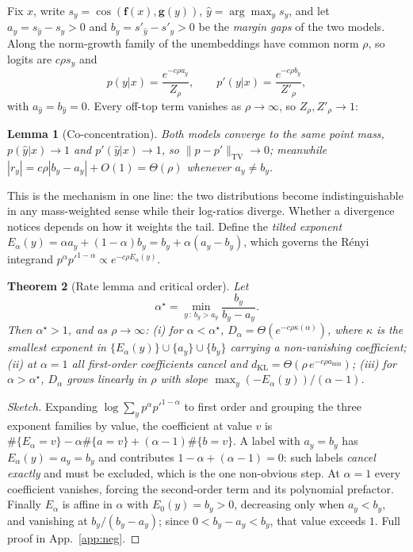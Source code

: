 \documentclass[10pt,letterpaper,twocolumn]{article}
\newcommand{\bff}{\mathbf{f}}
\newcommand{\bfg}{\mathbf{g}}
\newcommand{\dKL}{d_{\mathrm{KL}}}
\newcommand{\Dalpha}{D_{\alpha}}
\newcommand{\TV}{\mathrm{TV}}
\theoremstyle{plain}
\newtheorem{theorem}{Theorem}
\newtheorem{lemma}[theorem]{Lemma}
\theoremstyle{definition}
\theoremstyle{remark}
\begin{document}
Fix $x$, write $s_{y}=\cos(\bff(x),\bfg(y))$, $\hat y=\arg\max_{y}s_{y}$, and
let $a_{y}=s_{\hat y}-s_{y}>0$ and $b_{y}=s'_{\hat y}-s'_{y}>0$ be the
\emph{margin gaps} of the two models. Along the norm-growth family of
\citet{nielsen2025} the unembeddings have common norm $\rho$, so logits are
$c\rho s_{y}$ and
\begin{equation}
p(y|x)=\frac{e^{-c\rho a_{y}}}{Z_{\rho}},\qquad
p'(y|x)=\frac{e^{-c\rho b_{y}}}{Z'_{\rho}},
\label{eq:family}
\end{equation}
with $a_{\hat y}=b_{\hat y}=0$. Every off-top term vanishes as $\rho\to\infty$,
so $Z_{\rho},Z'_{\rho}\to1$:

\begin{lemma}[Co-concentration]
\label{lem:coconc}
Both models converge to the \emph{same} point mass,
$p(\hat y|x)\to1$ and $p'(\hat y|x)\to1$, so $\|p-p'\|_{\TV}\to0$; meanwhile
$|r_{y}|=c\rho|b_{y}-a_{y}|+O(1)=\Theta(\rho)$ whenever $a_{y}\neq b_{y}$.
\end{lemma}

This is the mechanism in one line: the two distributions become
indistinguishable in any mass-weighted sense while their log-ratios diverge.
Whether a divergence notices depends on how it weights the tail. Define the
\emph{tilted exponent} $E_{\alpha}(y)=\alpha a_{y}+(1-\alpha)b_{y}
=b_{y}+\alpha(a_{y}-b_{y})$, which governs the R\'enyi integrand
$p^{\alpha}p'^{1-\alpha}\propto e^{-c\rho E_{\alpha}(y)}$.

\begin{theorem}[Rate lemma and critical order]
\label{thm:alphastar}
Let
\begin{equation}
\alpha^{\star}=\min_{y\,:\,b_{y}>a_{y}}\frac{b_{y}}{b_{y}-a_{y}} .
\label{eq:alphastar}
\end{equation}
Then $\alpha^{\star}>1$, and as $\rho\to\infty$: \emph{(i)} for
$\alpha<\alpha^{\star}$, $\Dalpha=\Theta(e^{-c\rho\kappa(\alpha)})$, where
$\kappa$ is the smallest exponent in
$\{E_{\alpha}(y)\}\cup\{a_{y}\}\cup\{b_{y}\}$ carrying a non-vanishing
coefficient; \emph{(ii)} at $\alpha=1$ all first-order coefficients cancel and
$\dKL=\Theta(\rho\,e^{-c\rho a_{\min}})$; \emph{(iii)} for
$\alpha>\alpha^{\star}$, $\Dalpha$ grows \emph{linearly} in $\rho$ with slope
$\max_{y}(-E_{\alpha}(y))/(\alpha-1)$.
\end{theorem}

\begin{proof}[Sketch]
Expanding $\log\sum_{y}p^{\alpha}p'^{1-\alpha}$ to first order and grouping the
three exponent families by value, the coefficient at value $v$ is
$\#\{E_{\alpha}=v\}-\alpha\#\{a=v\}+(\alpha-1)\#\{b=v\}$. A label with
$a_{y}=b_{y}$ has $E_{\alpha}(y)=a_{y}=b_{y}$ and contributes
$1-\alpha+(\alpha-1)=0$: such labels \emph{cancel exactly} and must be excluded,
which is the one non-obvious step. At $\alpha=1$ every coefficient vanishes,
forcing the second-order term and its polynomial prefactor. Finally
$E_{\alpha}$ is affine in $\alpha$ with $E_{0}(y)=b_{y}>0$, decreasing only
when $a_{y}<b_{y}$, and vanishing at $b_{y}/(b_{y}-a_{y})$; since
$0<b_{y}-a_{y}<b_{y}$, that value exceeds $1$. Full proof in
App.~\ref{app:neg}.
\end{proof}
\end{document}
